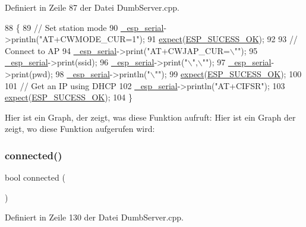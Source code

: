 Definiert in Zeile 87 der Datei Dumb\+Server.\+cpp.


\begin{DoxyCode}
88 \{
89   \textcolor{comment}{// Set station mode}
90   \hyperlink{classEspServer_a552aab874ad99b696f4c997d6f5a4746}{\_esp\_serial}->println(\textcolor{stringliteral}{"AT+CWMODE\_CUR=1"});
91   \hyperlink{classEspServer_aff5ea67ab96af075223b2b836036ccf1}{expect}(\hyperlink{DumbServer_8cpp_a62497fcb12b1cedd5fdfbc0755508d87}{ESP\_SUCESS\_OK});
92 
93   \textcolor{comment}{// Connect to AP}
94   \hyperlink{classEspServer_a552aab874ad99b696f4c997d6f5a4746}{\_esp\_serial}->print(\textcolor{stringliteral}{"AT+CWJAP\_CUR=\(\backslash\)""});
95   \hyperlink{classEspServer_a552aab874ad99b696f4c997d6f5a4746}{\_esp\_serial}->print(ssid);
96   \hyperlink{classEspServer_a552aab874ad99b696f4c997d6f5a4746}{\_esp\_serial}->print(\textcolor{stringliteral}{"\(\backslash\)",\(\backslash\)""});
97   \hyperlink{classEspServer_a552aab874ad99b696f4c997d6f5a4746}{\_esp\_serial}->print(pwd);
98   \hyperlink{classEspServer_a552aab874ad99b696f4c997d6f5a4746}{\_esp\_serial}->println(\textcolor{stringliteral}{"\(\backslash\)""});
99   \hyperlink{classEspServer_aff5ea67ab96af075223b2b836036ccf1}{expect}(\hyperlink{DumbServer_8cpp_a62497fcb12b1cedd5fdfbc0755508d87}{ESP\_SUCESS\_OK});
100 
101   \textcolor{comment}{// Get an IP using DHCP}
102   \hyperlink{classEspServer_a552aab874ad99b696f4c997d6f5a4746}{\_esp\_serial}->println(\textcolor{stringliteral}{"AT+CIFSR"});
103   \hyperlink{classEspServer_aff5ea67ab96af075223b2b836036ccf1}{expect}(\hyperlink{DumbServer_8cpp_a62497fcb12b1cedd5fdfbc0755508d87}{ESP\_SUCESS\_OK});
104 \}
\end{DoxyCode}
Hier ist ein Graph, der zeigt, was diese Funktion aufruft\+:
Hier ist ein Graph der zeigt, wo diese Funktion aufgerufen wird\+:
\mbox{\label{classEspServer_a59fc494d53391b27e2fd75cb750690d9}} 
\subsubsection{\texorpdfstring{connected()}{connected()}}
{\footnotesize\ttfamily bool connected (\begin{DoxyParamCaption}{ }\end{DoxyParamCaption})}



Definiert in Zeile 130 der Datei Dumb\+Server.\+cpp.


